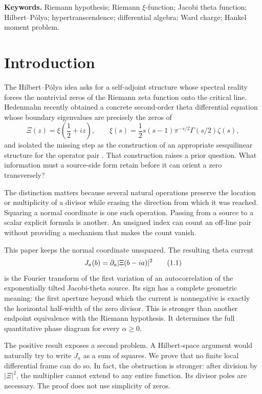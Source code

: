 \documentclass[11pt]{article}
\theoremstyle{definition}
\theoremstyle{remark}
\newcommand{\eqtag}[1]{\qquad\text{\upshape(#1)}}
\begin{document}
\medskip
\noindent\textbf{Keywords.}
Riemann hypothesis; Riemann \(\xi\)-function; Jacobi theta function;
Hilbert--P\'olya; hypertranscendence; differential algebra; Ward charge;
Hankel moment problem.

\section{Introduction}

The Hilbert--P\'olya idea asks for a self-adjoint structure whose spectral
reality forces the nontrivial zeros of the Riemann zeta function onto the
critical line.  Hedenmalm recently obtained a concrete second-order
theta differential equation whose boundary eigenvalues are precisely the
zeros of
\[
  \Xi(z)=\xi\left(\frac12+iz\right),
  \qquad
  \xi(s)=\frac12s(s-1)\pi^{-s/2}\Gamma(s/2)\zeta(s),
\]
and isolated the missing step as the construction of an appropriate
sesquilinear structure for the operator pair
\cite{Hedenmalm2026}.  That construction raises a prior question.
What information must a source-side form retain before it can orient a
zero transversely?

The distinction matters because several natural operations preserve the
location or multiplicity of a divisor while erasing the direction from
which it was reached.  Squaring a normal coordinate is one such
operation.  Passing from a source to a scalar explicit formula is another.
An unsigned index can count an off-line pair without providing a
mechanism that makes the count vanish.

This paper keeps the normal coordinate unsquared.  The resulting
theta current
\[
  J_a(b)=\partial_a|\Xi(b-ia)|^2                     \eqtag{1.1}
\]
is the Fourier transform of the first variation of an autocorrelation of
the exponentially tilted Jacobi-theta source.  Its sign has a complete
geometric meaning: the first aperture beyond which the current is
nonnegative is exactly the horizontal half-width of the zero divisor.
This is stronger than another endpoint equivalence with the Riemann
hypothesis.  It determines the full quantitative phase diagram for every
\(\alpha\geq0\).

The positive result exposes a second problem.  A Hilbert-space argument
would naturally try to write \(J_a\) as a sum of squares.  We prove that
no finite local differential frame can do so.  In fact, the obstruction
is stronger: after division by \(|\Xi|^2\), the multiplier cannot extend
to any entire function.  Its divisor poles are necessary.  The proof
does not use simplicity of zeros.
\end{document}
